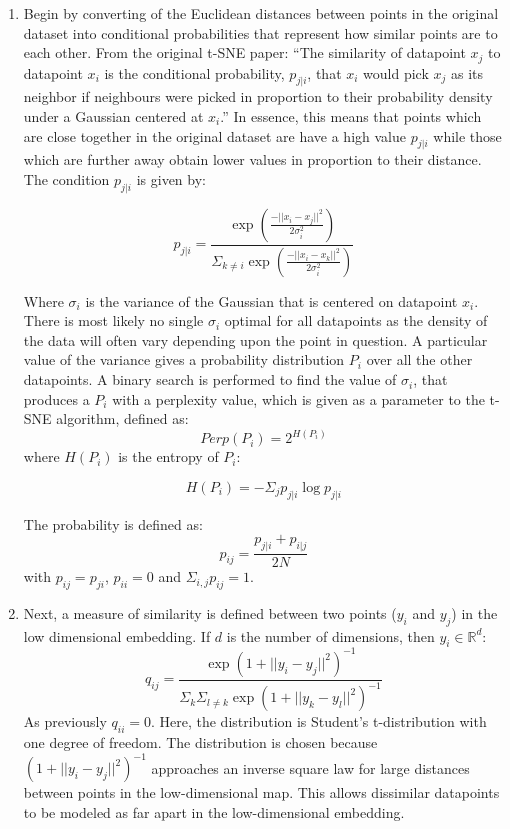 \documentclass[a4paper, 12pt, twoside]{report}
\begin{document}
\begin{enumerate}
    \item Begin by converting of the Euclidean distances between points in the original dataset into conditional probabilities that represent how similar points are to each other. From the original t-SNE paper: ``The similarity of datapoint $x_{j}$ to datapoint $x_{i}$ is the conditional probability, $p_{j|i}$, that $x_{i}$ would pick $x_{j}$ as its neighbor if  neighbours were picked in proportion to their probability density under a Gaussian centered at $x_{i}$.'' In essence, this means that points which are close together in the original dataset are have a high value $p_{j|i}$ while those which are further away obtain lower values in proportion to their distance. The condition $p_{j|i}$ is given by:

    \[ p_{j|i} = \frac{\exp(\frac{-||x_{i}-x_{j}||^{2}}{2\sigma_{i}^{2}})}{\Sigma_{k \neq i}\exp(\frac{-||x_{i}-x_{k}||^{2}}{2\sigma_{i}^{2}})} \]

    Where $\sigma_{i}$ is the variance of the Gaussian that is centered on datapoint $x_{i}$. There is most likely no single $\sigma_{i}$ optimal for all datapoints as the density of the data will often vary depending upon the point in question. A particular value of the variance gives a probability distribution $P_{i}$ over all the other datapoints. A binary search is performed to find the value of $\sigma_{i}$, that produces a $P_{i}$ with a perplexity value, which is given as a parameter to the t-SNE algorithm, defined as:
    \[ Perp(P_{i}) = 2^{H(P_{i})} \]
    where $H(P_{i})$ is the entropy of $P_{i}$:

    \[ H(P_{i}) = - \Sigma_{j}p_{j|i} \log p_{j|i} \]

    The probability is defined as:
    \[ p_{ij} = \frac{p_{j|i} + p_{i|j}}{2N}\]
    with $p_{ij} = p_{ji}$, $p_{ii} = 0$ and $\Sigma_{i,j}p_{ij} = 1$.

    \item Next, a measure of similarity is defined between two points ($y_{i}$ and $y_{j}$) in the low dimensional embedding. If $d$ is the number of dimensions, then $y_{i} \in \mathbb{R}^{d}$:
    \[ q_{ij} = \frac{\exp(1 + ||y_{i} - y_{j}||^{2})^{-1}}{\Sigma_{k}\Sigma_{l \neq k}\exp( 1 + ||y_{k} - y_{l}||^{2})^{-1}} \]
    As previously $q_{ii} = 0$. Here, the distribution is Student's t-distribution with one degree of freedom. The distribution is chosen because $(1 + ||y_{i} - y_{j}||^{2})^{-1}$ approaches an inverse square law for large distances between points in the low-dimensional map. This allows dissimilar datapoints to be modeled as far apart in the low-dimensional embedding.


\end{enumerate}
\end{document}
